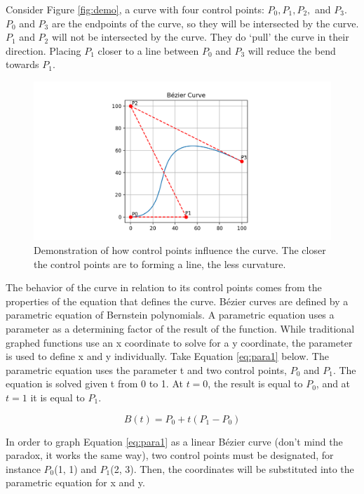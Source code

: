 \documentclass[12pt,letterpaper]{article}
\begin{document}
Consider Figure \ref{fig:demo}, a curve with four control points: $P_0, P_1, P_2,$ and $P_3$. $P_0$ and $P_3$ are the endpoints of the curve, so they will be intersected by the curve. $P_1$ and $P_2$ will not be intersected by the curve. They do ‘pull’ the curve in their direction. Placing $P_1$ closer to a line between $P_0$ and $P_3$ will reduce the bend towards $P_1$.

\begin{figure}[H]
    \includegraphics[width=15cm]{Figure_2}
    \centering
    \caption{Demonstration of how control points influence the curve. The closer the control points are to forming a line, the less curvature.}
    \label{fig:demo2}
\end{figure}

The behavior of the curve in relation to its control points comes from the properties of the equation that defines the curve. B\'ezier curves are defined by a parametric equation of Bernstein polynomials. A parametric equation uses a parameter as a determining factor of the result of the function. While traditional graphed functions use an x coordinate to solve for a y coordinate, the parameter is used to define x and y individually. 
Take Equation \ref{eq:para1} below. The parametric equation uses the parameter t and two control points, $P_0$ and $P_1$. The equation is solved given t from 0 to 1. At $t=0$, the result is equal to $P_0$, and at $t=1$ it is equal to $P_1$.

\begin{equation}
    \label{eq:para1}
    B(t) = P_0 + t(P_1 - P_0)
\end{equation}

In order to graph Equation \ref{eq:para1} as a linear B\'ezier curve (don’t mind the paradox, it works the same way), two control points must be designated, for instance $P_0$(1, 1) and $P_1$(2, 3). Then, the coordinates will be substituted into the parametric equation for x and y.
\end{document}
